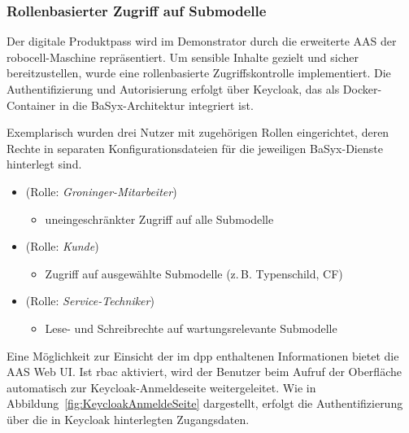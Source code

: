 \subsubsection{Rollenbasierter Zugriff auf Submodelle}
Der digitale Produktpass wird im Demonstrator durch die erweiterte AAS der robocell-Maschine repräsentiert. 
Um sensible Inhalte gezielt und sicher bereitzustellen, wurde eine rollenbasierte Zugriffskontrolle implementiert. 
Die Authentifizierung und Autorisierung erfolgt über Keycloak, das als Docker-Container in die BaSyx-Architektur integriert ist.

Exemplarisch wurden drei Nutzer mit zugehörigen Rollen eingerichtet, deren Rechte in separaten Konfigurationsdateien für die jeweiligen BaSyx-Dienste hinterlegt sind.

\newpage
\begin{itemize}[noitemsep, leftmargin=*, label=\textbullet]
  \item {} (Rolle: \textit{Groninger-Mitarbeiter})
    \begin{itemize}[noitemsep, leftmargin=2em, label=--]
      \item uneingeschränkter Zugriff auf alle Submodelle
    \end{itemize}
  \item {} (Rolle: \textit{Kunde})
    \begin{itemize}[noitemsep, leftmargin=2em, label=--]
      \item Zugriff auf ausgewählte Submodelle (z.\,B. Typenschild, CF)
    \end{itemize}
  \item {} (Rolle: \textit{Service-Techniker})
    \begin{itemize}[noitemsep, leftmargin=2em, label=--]
      \item Lese- und Schreibrechte auf wartungsrelevante Submodelle
    \end{itemize}
\end{itemize}
\vspace{0.5em}

Eine Möglichkeit zur Einsicht der im \acs{dpp} enthaltenen Informationen bietet die AAS Web UI.
Ist \acs{rbac} aktiviert, wird der Benutzer beim Aufruf der Oberfläche automatisch zur Keycloak-Anmeldeseite weitergeleitet.
Wie in Abbildung~\ref{fig:KeycloakAnmeldeSeite} dargestellt, erfolgt die Authentifizierung über die in Keycloak hinterlegten Zugangsdaten.

